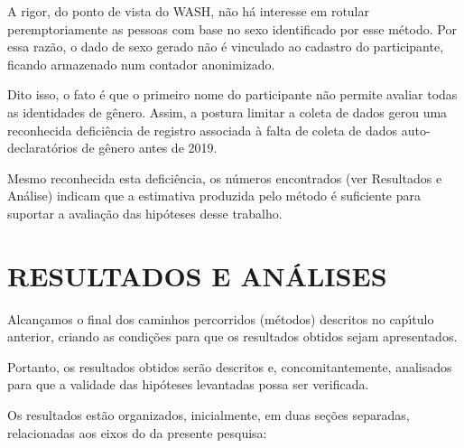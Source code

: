 \documentclass[
12pt,		%
openright,	%
twoside,  %
a4paper,			%
chapter=TITLE,		%
english,			%
french,				%
spanish,			%
brazil				%
]{USPSC-classe/USPSC}
\begin{document}
A rigor, do ponto de vista do WASH, n\~ao h\'a interesse em rotular peremptoriamente as pessoas com base no sexo identificado por esse m\'etodo. Por essa raz\~ao, o dado de sexo gerado n\~ao \'e vinculado ao cadastro do participante, ficando armazenado num contador anonimizado.










Dito isso, o fato \'e que o primeiro nome do participante n\~ao permite avaliar todas as identidades de g\^enero. Assim, a postura limitar a coleta de dados gerou uma reconhecida defici\^encia de registro associada \`a falta de coleta de dados auto-declarat\'orios de g\^enero antes de 2019.










Mesmo reconhecida esta defici\^encia, os n\'umeros encontrados (ver Resultados e An\'alise) indicam que a estimativa produzida pelo m\'etodo \'e suficiente para suportar a avalia\c{c}\~ao das hip\'oteses desse trabalho.










\chapter[RESULTADOS E AN\'ALISES]{RESULTADOS E AN\'ALISES}\label{RESULTADOS E AN\'ALISES}
Alcan\c{c}amos o final dos caminhos percorridos (m\'etodos) descritos no cap\'{\i}tulo anterior, criando as condi\c{c}\~oes para que os resultados obtidos sejam apresentados.










Portanto, os resultados obtidos ser\~ao descritos e, concomitantemente, analisados para que a validade das hip\'oteses levantadas possa ser verificada.










Os resultados est\~ao organizados, inicialmente, em duas se\c{c}\~oes separadas, relacionadas aos eixos do da presente pesquisa:
\end{document}

